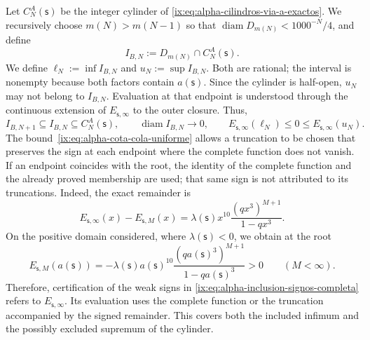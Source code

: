 Let \(C_N^A(\mathsf s)\) be the integer cylinder of
\eqref{ix:eq:alpha-cilindros-via-a-exactos}. We recursively choose
\(m(N)>m(N-1)\) so that
\(\operatorname{diam}D_{m(N)}<1000^{-N}/4\), and define
\begin{equation}
I_{B,N}:=D_{m(N)}\cap C_N^A(\mathsf s).
 \label{ix:eq:alpha-intervalos-b-completos}
\end{equation}
We define
\(\ell_N:=\inf I_{B,N}\) and \(u_N:=\sup I_{B,N}\). Both are rational;
the interval is nonempty because both factors contain
\(a(\mathsf s)\). Since the cylinder is half-open, \(u_N\) may not
belong to \(I_{B,N}\). Evaluation at that endpoint is understood through
the continuous extension of \(E_{\mathsf s,\infty}\) to the outer closure. Thus,
\begin{equation}
 I_{B,N+1}\subseteq I_{B,N}\subseteq C_N^A(\mathsf s),
 \qquad \operatorname{diam}I_{B,N}\longrightarrow0,
 \qquad E_{\mathsf s,\infty}(\ell_N)\leq0\leq
 E_{\mathsf s,\infty}(u_N).
 \label{ix:eq:alpha-inclusion-signos-completa}
\end{equation}
The bound~\eqref{ix:eq:alpha-cota-cola-uniforme} allows a
truncation to be chosen that preserves the sign at each endpoint where the complete function
does not vanish. If an endpoint coincides with the root, the identity of
the complete function and the already proved membership are used; that same
sign is not attributed to its truncations. Indeed, the exact remainder is
\[
 E_{\mathsf s,\infty}(x)-E_{\mathsf s,M}(x)
 =\lambda(\mathsf s)x^{10}
   \frac{(qx^3)^{M+1}}{1-qx^3}.
\]
On the positive domain considered, where \(\lambda(\mathsf s)<0\), we
obtain at the root
\[
 E_{\mathsf s,M}(a(\mathsf s))
 =-\lambda(\mathsf s)a(\mathsf s)^{10}
   \frac{(qa(\mathsf s)^3)^{M+1}}{1-qa(\mathsf s)^3}>0
 \qquad(M<\infty).
\]
Therefore, certification of the weak signs in
\eqref{ix:eq:alpha-inclusion-signos-completa} refers to
\(E_{\mathsf s,\infty}\). Its evaluation uses the complete function or the
truncation accompanied by the signed remainder. This covers both the included infimum
and the possibly excluded supremum of the cylinder.

